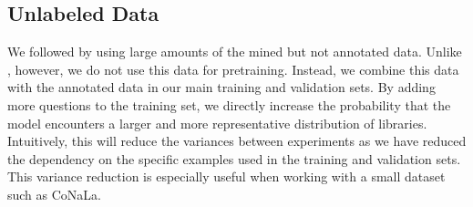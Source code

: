 \documentclass[11pt]{article}
\begin{document}
\subsection{Unlabeled Data}\label{subsec:unlabeled}
We followed \citet{xu-etal-2020-incorporating} by using large amounts of the mined but not annotated data.  Unlike \citet{xu-etal-2020-incorporating}, however, we do not use this data for pretraining. Instead, we combine this data with the annotated data in our main training and validation sets. 
By adding more questions to the training set, we directly increase the probability that the model encounters a larger and more representative distribution of libraries. Intuitively, this will reduce the variances between experiments as we have reduced the dependency on the specific examples used in the training and validation sets. This variance reduction is especially useful when working with a small dataset such as CoNaLa.
\end{document}
